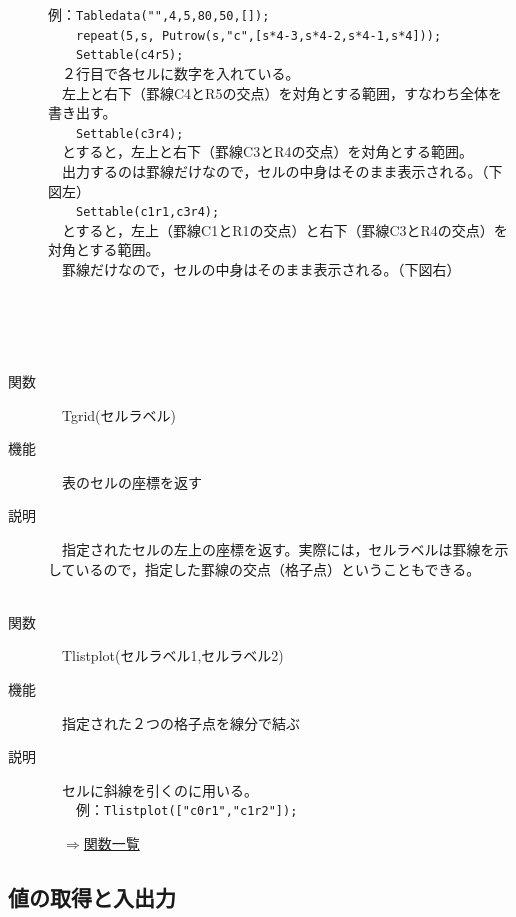 \documentclass[papersize,a4paper,12pt,uplatex]{jsarticle}
\begin{document}
\begin{description}
例：\verb|Tabledata("",4,5,80,50,[]);|\\
　　\verb|repeat(5,s, Putrow(s,"c",[s*4-3,s*4-2,s*4-1,s*4]));|\\
　　\verb|Settable(c4r5);|\\

　２行目で各セルに数字を入れている。\\
　左上と右下（罫線C4とR5の交点）を対角とする範囲，すなわち全体を書き出す。\\
　　\verb|Settable(c3r4);|\\
　とすると，左上と右下（罫線C3とR4の交点）を対角とする範囲。\\
　出力するのは罫線だけなので，セルの中身はそのまま表示される。（下図左）\\
　　\verb|Settable(c1r1,c3r4);|\\
　とすると，左上（罫線C1とR1の交点）と右下（罫線C3とR4の交点）を対角とする範囲。\\
　罫線だけなので，セルの中身はそのまま表示される。（下図右）\\
\\
　　　　　　　　　　\\
　\\
　\\
\hypertarget{tgrid}{}
\item[関数]　Tgrid(セルラベル)
\item[機能]　表のセルの座標を返す
\item[説明]　指定されたセルの左上の座標を返す。実際には，セルラベルは罫線を示しているので，指定した罫線の交点（格子点）ということもできる。\\
　\\
\hypertarget{tlistplot}{}
\item[関数]　Tlistplot(セルラベル1,セルラベル2)
\item[機能]　指定された２つの格子点を線分で結ぶ
\item[説明]　セルに斜線を引くのに用いる。\\
　　例：\verb|Tlistplot(["c0r1","c1r2"]);| 
　\\
\begin{flushright}　\hyperlink{functionlist}{$\Rightarrow$関数一覧}\end{flushright}

\end{description}

\newpage

\subsection{値の取得と入出力}
\end{document}
